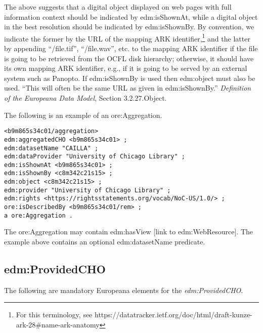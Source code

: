 \documentclass[11pt]{article}
\begin{document}
The above suggests that a digital object displayed on web pages with full information context should be indicated by edm:isShownAt, while a digital object in the best resolution should be indicated by edm:isShownBy. By convention, we indicate the former by the URL of the mapping ARK identifier,\footnote{For this terminology, see https://datatracker.ietf.org/doc/html/draft-kunze-ark-28\#name-ark-anatomy} and the latter by appending ``/file.tif'', ``/file.wav'', etc. to the mapping ARK identifier if the file is going to be retrieved from the OCFL disk hierarchy; otherwise, it should have its own mapping ARK identifier, e.g., if it is going to be served by an external system such as Panopto. If edm:isShownBy is used then edm:object must also be used. ``This will often be the same URL as given in edm:isShownBy.'' \textit{Definition of the Europeana Data Model}, Section 3.2.27.Object.


The following is an example of an ore:Aggregation.

\begin{verbatim}
<b9m865s34c01/aggregation>
edm:aggregatedCHO <b9m865s34c01> ;
edm:datasetName "CAILLA" ;
edm:dataProvider "University of Chicago Library" ;
edm:isShownAt <b9m865s34c01> ;
edm:isShownBy <c8m342c21s15> ;
edm:object <c8m342c21s15> ;
edm:provider "University of Chicago Library" ;
edm:rights <https://rightsstatements.org/vocab/NoC-US/1.0/> ;
ore:isDescribedBy <b9m865s34c01/rem> ;
a ore:Aggregation .
\end{verbatim}  

The ore:Aggregation may contain edm:hasView [link to edm:WebResource]. The example above contains an optional edm:datasetName predicate.

\subsection{edm:ProvidedCHO}
The following are mandatory Europeana elements for the \textit{edm:ProvidedCHO}.
\end{document}
